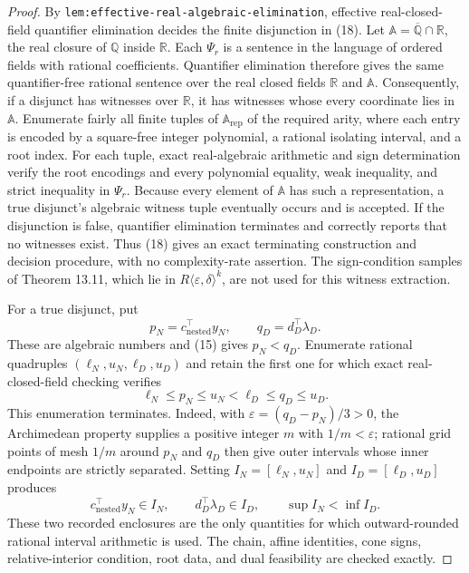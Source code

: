 \documentclass{article}
\begin{document}
\begin{proof}
By \texttt{lem:effective-real-algebraic-elimination}, effective real-closed-field quantifier elimination decides the finite disjunction in (18).  Let \(\mathbb A=\overline{\mathbb Q}\cap\mathbb R\), the real closure of \(\mathbb Q\) inside \(\mathbb R\).  Each \(\Psi_r\) is a sentence in the language of ordered fields with rational coefficients.  Quantifier elimination therefore gives the same quantifier-free rational sentence over the real closed fields \(\mathbb R\) and \(\mathbb A\).  Consequently, if a disjunct has witnesses over \(\mathbb R\), it has witnesses whose every coordinate lies in \(\mathbb A\).  Enumerate fairly all finite tuples of \(\mathbb A_{\mathrm{rep}}\) of the required arity, where each entry is encoded by a square-free integer polynomial, a rational isolating interval, and a root index.  For each tuple, exact real-algebraic arithmetic and sign determination verify the root encodings and every polynomial equality, weak inequality, and strict inequality in \(\Psi_r\).  Because every element of \(\mathbb A\) has such a representation, a true disjunct's algebraic witness tuple eventually occurs and is accepted.  If the disjunction is false, quantifier elimination terminates and correctly reports that no witnesses exist.  Thus (18) gives an exact terminating construction and decision procedure, with no complexity-rate assertion.  The sign-condition samples of Theorem 13.11, which lie in \(R\langle\varepsilon,\delta\rangle^k\), are not used for this witness extraction.

For a true disjunct, put
\[
 p_N=c_{\mathrm{nested}}^{\top}y_N,
 \qquad q_D=d_D^{\top}\lambda_D.
\]
These are algebraic numbers and (15) gives \(p_N<q_D\).  Enumerate rational quadruples \((\ell_N,u_N,\ell_D,u_D)\) and retain the first one for which exact real-closed-field checking verifies
\[
 \ell_N\leq p_N\leq u_N<\ell_D\leq q_D\leq u_D.                       \tag{19}
\]
This enumeration terminates.  Indeed, with \(\varepsilon=(q_D-p_N)/3>0\), the Archimedean property supplies a positive integer \(m\) with \(1/m<\varepsilon\); rational grid points of mesh \(1/m\) around \(p_N\) and \(q_D\) then give outer intervals whose inner endpoints are strictly separated.  Setting \(I_N=[\ell_N,u_N]\) and \(I_D=[\ell_D,u_D]\) produces
\[
 c_{\mathrm{nested}}^{\top}y_N\in I_N,
 \qquad d_D^{\top}\lambda_D\in I_D,
 \qquad \sup I_N<\inf I_D.                                             \tag{20}
\]
These two recorded enclosures are the only quantities for which outward-rounded rational interval arithmetic is used.  The chain, affine identities, cone signs, relative-interior condition, root data, and dual feasibility are checked exactly.


\end{proof}
\end{document}
